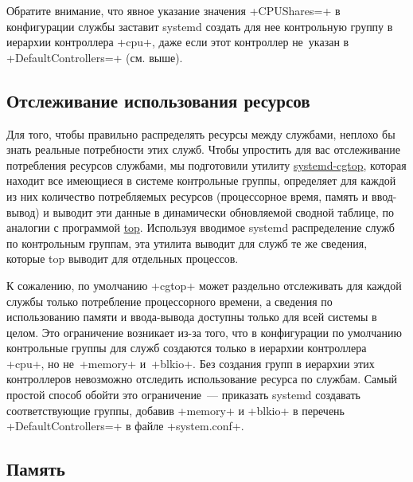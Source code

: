 \documentclass[10pt,oneside,a4paper]{article}
\begin{document}
Обратите внимание, что явное указание значения +CPUShares=+ в конфигурации
службы заставит systemd создать для нее контрольную группу в иерархии контроллера
+cpu+, даже если этот контроллер не~указан в +DefaultControllers=+ (см. выше).

\subsection{Отслеживание использования ресурсов}

Для того, чтобы правильно распределять ресурсы между службами, неплохо бы знать
реальные потребности этих служб. Чтобы упростить для вас отслеживание
потребления ресурсов службами, мы подготовили утилиту
\href{http://www.freedesktop.org/software/systemd/man/systemd-cgtop.html}{systemd-cgtop},
которая находит все имеющиеся в системе контрольные группы, определяет для
каждой из них количество потребляемых ресурсов (процессорное время, память и
ввод-вывод) и выводит эти данные в динамически обновляемой сводной таблице, по аналогии
с программой \href{http://linux.die.net/man/1/top}{top}. Используя вводимое
systemd распределение служб по контрольным группам, эта утилита выводит для
служб те же сведения, которые top выводит для отдельных процессов.

К сожалению, по умолчанию +cgtop+ может раздельно отслеживать для каждой службы
только потребление процессорного времени, а сведения по использованию памяти и
ввода-вывода доступны только для всей системы в целом. Это ограничение возникает
из-за того, что в конфигурации по умолчанию контрольные группы для служб
создаются только в иерархии контроллера +cpu+, но не~+memory+ и~+blkio+. Без
создания групп в иерархии этих контроллеров невозможно отследить использование
ресурса по службам. Самый простой способ обойти это ограничение~--- приказать
systemd создавать соответствующие группы, добавив +memory+ и +blkio+ в перечень
+DefaultControllers=+ в файле +system.conf+.

\subsection{Память}
\end{document}
